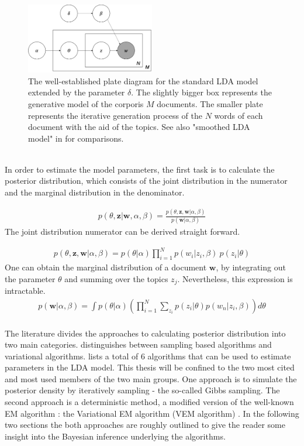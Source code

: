 \documentclass[11pt,a4paper]{article}
\begin{document}
\begin{figure}[h]
	\centering
	\includegraphics[width=0.5\textwidth]{LDA_Plate_Diagram.png}
	\caption{The well-established plate diagram for the standard LDA model extended by the parameter $\delta$. The slightly bigger box represents the generative model of the corporis $M$ documents. The smaller plate represents the iterative generation process of the $N$ words of each document with the aid of the topics. See also "smoothed LDA model" in \cite{Blei2003}  for comparisons.}
	\label{fig:PlateDiagram}
\end{figure}
\ \\
In order to estimate the model parameters, the first task is to calculate the posterior distribution, which consists of the joint distribution in the numerator and the marginal distribution in the denominator.

\begin{align}\label{posterior}
p(\theta,\textbf{z}|\textbf{w},\alpha,\beta)= \frac{p(\theta,\textbf{z},\textbf{w}|\alpha,\beta)}
{p(\textbf{w}|\alpha, \beta)}
\end{align}
The joint distribution numerator can be derived straight forward.

\begin{align}\label{joint}
p(\theta,\textbf{z},\textbf{w}|\alpha,\beta)=p(\theta|\alpha)\prod_{i=1}^{N}p(w_i|z_i,\beta)\ p(z_i|\theta)
\end{align}
One can obtain the marginal distribution of a document $\textbf{w}$, by integrating out the parameter $\theta$ and summing over the topics $z_j$. Nevertheless, this expression is intractable.
\begin{align}\label{marginal}
p(\textbf{w}|\alpha, \beta)=\int p(\theta|\alpha) \left( \prod_{i=1}^{N} \sum_{z_i}p(z_i|\theta)p(w_n|z_i,\beta) \right) d\theta
\end{align}
\ \\
The literature divides the approaches to calculating posterior distribution into two main categories.\cite{Blei2012} distinguishes between sampling based algorithms and variational algorithms. \cite{Powieser2012} lists a total of 6 algorithms that can be used to estimate parameters in the LDA model. This thesis will be confined to the two most cited and most used members of the two main groups. One approach is to simulate the posterior density by iteratively sampling - the so-called Gibbs sampling. The second approach is a deterministic method, a modified version of the well-known EM algorithm \cite{Dempster1977}: the Variational EM algorithm (VEM algorithm) \cite{Wainwright2008}. In the following two sections the both approaches are roughly outlined to give the reader some insight into the Bayesian inference underlying the algorithms.
\end{document}
